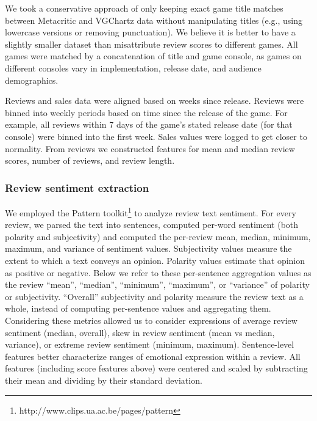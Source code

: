 \documentclass{sig-alternate}
\begin{document}
We took a conservative approach of only keeping exact game title matches
between Metacritic and VGChartz data without manipulating titles (e.g.,
using lowercase versions or removing punctuation). We believe it is better to have a slightly smaller dataset than misattribute review scores to different games. All games were matched by a concatenation of title and game console, as games on different consoles vary in implementation, release date, and audience demographics. 

Reviews and sales data were aligned based on weeks since release. Reviews were binned into weekly periods based on time since the release of the game. For example, all reviews within 7 days of the game's stated release date (for that console) were binned into the first week. Sales values were logged to get closer to normality. From reviews we constructed features for mean and median review scores, number of reviews, and review length.

\subsubsection{Review sentiment extraction}
We employed the Pattern toolkit\footnote{http://www.clips.ua.ac.be/pages/pattern} to analyze review text sentiment. For every review, we parsed the text into sentences, computed per-word sentiment (both polarity and subjectivity) and computed the per-review mean, median, minimum, maximum, and variance of sentiment values. Subjectivity values measure the extent to which a text conveys an opinion. Polarity values estimate that opinion as positive or negative. Below we refer to these per-sentence aggregation values as the review ``mean'', ``median'', ``minimum'', ``maximum'', or ``variance'' of polarity or subjectivity. ``Overall'' subjectivity and polarity measure the review text as a whole, instead of computing per-sentence values and aggregating them. Considering these metrics allowed us to consider expressions of average review sentiment (median, overall), skew in review sentiment (mean vs median, variance), or extreme review sentiment (minimum, maximum). Sentence-level features better characterize ranges of emotional expression within a review. All features (including score features above) were centered and scaled by subtracting their mean and dividing by their standard deviation.
\end{document}
